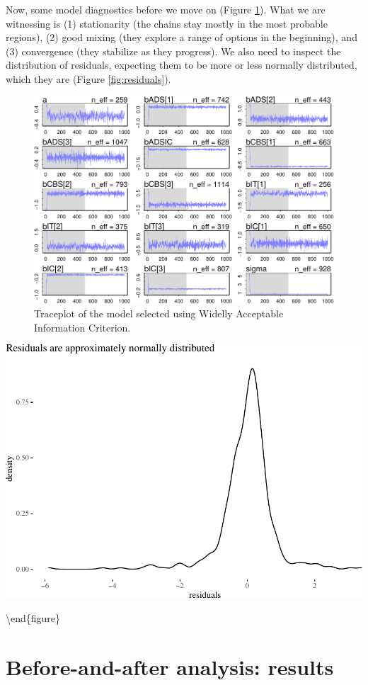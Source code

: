 \documentclass[
  10pt,
  dvipsnames, enabledeprecatedfontcommands]{scrartcl}
\begin{document}
\normalsize

Now, some model diagnostics before we move on (Figure
\ref{fig:traceplot}). What we are witnessing is (1) stationarity (the
chains stay mostly in the most probable regions), (2) good mixing (they
explore a range of options in the beginning), and (3) convergence (they
stabilize as they progress). We also need to inspect the distribution of
residuals, expecting them to be more or less normally distributed, which
they are (Figure \ref{fig:residuals}).

\begin{figure}

\begin{center}\includegraphics[width=1\linewidth]{technicalReport4_files/figure-latex/traceplot-1} \end{center}
\caption{Traceplot of the model selected using Widelly Acceptable Information Criterion.}
\label{fig:traceplot}
\end{figure}

\vspace{1mm}
\footnotesize

\begin{center}\includegraphics[width=1\linewidth]{technicalReport4_files/figure-latex/unnamed-chunk-8-1} \end{center}
\caption{Distribution of residuals from the selected model.}
\label{fig:residuals}

\textbackslash end\{figure\}

\hypertarget{before-and-after-analysis-results}{%
\section{Before-and-after analysis:
results}\label{before-and-after-analysis-results}}
\end{document}
